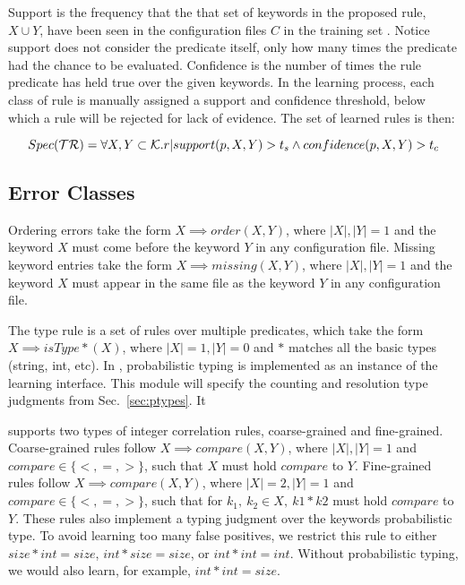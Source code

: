 Support is the frequency that the that set of keywords in the proposed rule, $X \cup Y$, have been seen in the configuration files $C$ in the training set \trainingSet.
Notice support does not consider the predicate itself, only how many times the predicate had the chance to be evaluated.
Confidence is the number of times the rule predicate has held true over the given keywords.
In the learning process, each class of rule is manually assigned a support and confidence threshold, below which a rule will be rejected for lack of evidence.
The set of learned rules is then:

\begin{equation}
  Spec(\mathcal{TR}) = \forall X,Y \subset \mathcal{K}. {r | support(p,X,Y) > t_s \land confidence(p,X,Y) > t_c}
\end{equation}

\subsection{Error Classes}
Ordering errors take the form $X \implies order(X,Y)$, where $|X|,|Y|=1$ and the keyword $X$ must come before the keyword $Y$ in any configuration file.
Missing keyword entries take the form $X \implies missing(X,Y)$, where $|X|,|Y|=1$ and the keyword $X$ must appear in the same file as the keyword $Y$ in any configuration file.

The type rule is a set of rules over multiple predicates, which take the form $X \implies isType\ast(X)$, where $|X|=1, |Y|=0$ and $\ast$ matches all the basic types (string, int, etc).
In \app, probabilistic typing is implemented as an instance of the learning interface.
This module will specify the counting and resolution type judgments from Sec.~\ref{sec:ptypes}.
It 

\app supports two types of integer correlation rules, coarse-grained and fine-grained.
Coarse-grained rules follow $X \implies compare(X,Y)$, where $|X|,|Y|=1$ and $compare \in \{<,=,>\}$, such that $X$ must hold $compare$ to $Y$.
Fine-grained rules follow $X \implies compare(X,Y)$, where $|X|=2,|Y|=1$ and $compare \in \{<,=,>\}$, such that for $k_1,\ k_2 \in X,\ k1*k2$ must hold $compare$ to $Y$.
These rules also implement a typing judgment over the keywords probabilistic type.
To avoid learning too many false positives, we restrict this rule to either $size*int=size$, $int*size=size$, or $int*int = int$.
Without probabilistic typing, we would also learn, for example, $int*int=size$.

